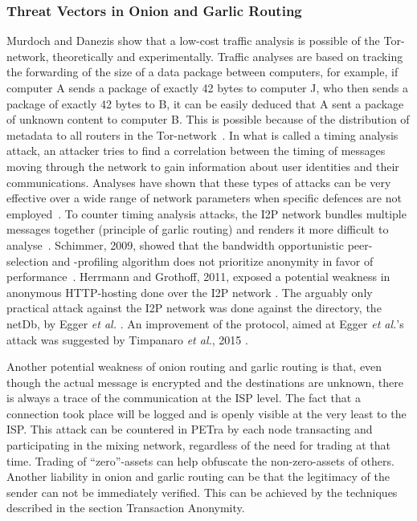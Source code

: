 \subsubsection{Threat Vectors in Onion and Garlic Routing}
\label{commthreat} 
	Murdoch and Danezis \cite{1425067} show that a low-cost traffic analysis is possible of the Tor-network, theoretically and experimentally. Traffic analyses are based on tracking the forwarding of the size of a data package between computers, for example, if computer A sends a package of exactly 42 bytes to computer J, who then sends a package of exactly 42 bytes to B, it can be easily deduced that A sent a package of unknown content to computer B. This is possible because of the distribution of metadata to all routers in the Tor-network~\cite{Hopper:2010:MAN:1698750.1698753}. In what is called a timing analysis attack, an attacker tries to find a correlation between the timing of messages moving through the network to gain information about user identities and their communications. Analyses have shown that these types of attacks can be very effective over a wide range of network parameters when specific defences are not employed~\cite{Levine2004,4797313}.  To counter timing analysis attacks, the I2P network bundles multiple messages together (principle of garlic routing) and renders it more difficult to analyse~\cite{Liu2014EmpiricalMA}. Schimmer, 2009, showed that the bandwidth opportunistic peer-selection and -profiling algorithm does not prioritize anonymity in favor of performance~\cite{peerProfiling:2009}. Herrmann and Grothoff, 2011, exposed a potential weakness in anonymous HTTP-hosting done over the I2P network \cite{Herrmann2011}. The arguably only practical attack against the I2P network was done against the directory, the netDb, by Egger \textit{et al.} \cite{Egger2013}. An improvement of the protocol, aimed at Egger \textit{et al.}'s attack was suggested by Timpanaro \textit{et al.}, 2015 \cite{Timpanaro2015}. 
    
Another potential weakness of onion routing and garlic routing is that, even though the actual message is encrypted and the destinations are unknown, there is always a trace of the communication at the ISP level. The fact that a connection took place will be logged and is openly visible at the very least to the ISP. This attack can be countered in PETra by each node transacting and participating in the mixing network, regardless of the need for trading at that time. Trading of ``zero''-assets can help obfuscate the non-zero-assets of others. Another liability in onion and garlic routing can be that the legitimacy of the sender can not be immediately verified. This can be achieved by the techniques described in the section Transaction Anonymity.  


